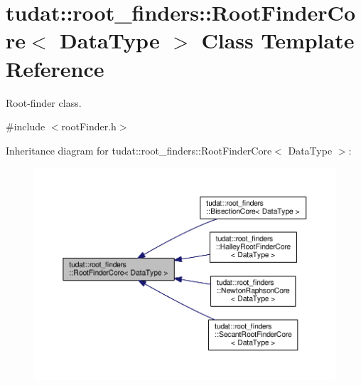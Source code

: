\hypertarget{classtudat_1_1root__finders_1_1RootFinderCore}{}\section{tudat\+:\+:root\+\_\+finders\+:\+:Root\+Finder\+Core$<$ Data\+Type $>$ Class Template Reference}
\label{classtudat_1_1root__finders_1_1RootFinderCore}


Root-\/finder class.  




{\ttfamily \#include $<$root\+Finder.\+h$>$}



Inheritance diagram for tudat\+:\+:root\+\_\+finders\+:\+:Root\+Finder\+Core$<$ Data\+Type $>$\+:
\nopagebreak
\begin{figure}[H]
\begin{center}
\leavevmode
\includegraphics[width=350pt]{classtudat_1_1root__finders_1_1RootFinderCore__inherit__graph}
\end{center}
\end{figure}
